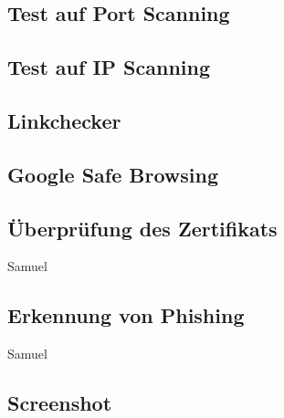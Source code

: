 \subsection{Test auf Port Scanning}

\subsection{Test auf IP Scanning}

\subsection{Linkchecker}

\subsection{Google Safe Browsing}

\subsection{Überprüfung des Zertifikats}

\todo Samuel

\subsection{Erkennung von Phishing}

\todo Samuel

\subsection{Screenshot}
